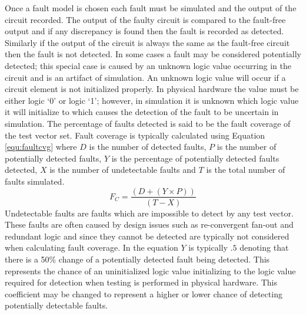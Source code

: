 \documentclass[12pt]{report}
\begin{document}
Once a fault model is chosen each fault must be simulated and the output of the circuit recorded.  The output of the faulty circuit is compared to the fault-free output and if any discrepancy is found then the fault is recorded as detected.  Similarly if the output of the circuit is always the same as the fault-free circuit then the fault is not detected\cite{defectforcmos}.  In some cases a fault may be considered potentially detected; this special case is caused by an unknown logic value occurring in the circuit and is an artifact of simulation.  An unknown logic value will occur if a circuit element is not initialized properly\cite{stroud}.  In physical hardware the value must be either logic `0' or logic `1'; however, in simulation it is unknown which logic value it will initialize to which causes the detection of the fault to be uncertain in simulation\cite{stroud}.  The percentage of faults detected is said to be the fault coverage of the test vector set\cite{defectforcmos}\cite{stroud}.  Fault coverage is typically calculated using Equation \ref{equ:faultcvg} where $D$ is the number of detected faults, $P$ is the number of potentially detected faults, $Y$ is the percentage of potentially detected faults detected, $X$ is the number of undetectable faults and $T$ is the total number of faults simulated\cite{stroud}.  
\begin{equation}
F_C = \frac{(D + (Y \times P))}{(T - X)}
\label{equ:faultcvg}
\end{equation}
Undetectable faults are faults which are impossible to detect by any test vector.  These faults are often caused by design issues such as re-convergent fan-out and redundant logic\cite{stroud} and since they cannot be detected are typically not considered when calculating fault coverage.  In the equation $Y$ is typically $.5$ denoting that there is a 50\% change of a potentially detected fault being detected.  This represents the chance of an uninitialized logic value initializing to the logic value required for detection when testing is performed in physical hardware.  This coefficient may be changed to represent a higher or lower chance of detecting potentially detectable faults\cite{stroud}.
\end{document}
